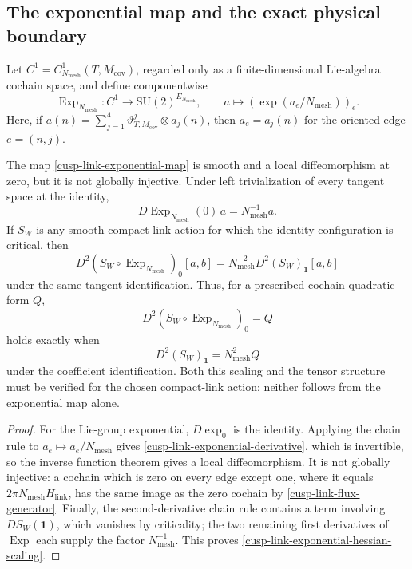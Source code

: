 \subsection{The exponential map and the exact physical boundary}

Let \(C^1=C^1_{N_{\mathrm{mesh}}}(T,M_{\mathrm{cov}})\), regarded only as a
finite-dimensional Lie-algebra cochain space, and define componentwise
\begin{equation}
 \operatorname{Exp}_{N_{\mathrm{mesh}}}:C^1
 \longrightarrow\mathrm{SU}(2)^{E_{N_{\mathrm{mesh}}}},
 \qquad
 a\longmapsto\left(\exp(a_e/N_{\mathrm{mesh}})\right)_e.
 \label{cusp-link-exponential-map}
\end{equation}
Here, if
\(a(n)=\sum_{j=1}^4\vartheta^j_{T,M_{\mathrm{cov}}}\otimes a_j(n)\),
then \(a_e=a_j(n)\) for the oriented edge \(e=(n,j)\).

\begin{proposition}
\label{cusp-link-exponential-local-only}
The map \eqref{cusp-link-exponential-map} is smooth and a local
diffeomorphism at zero, but it is not globally injective.  Under left
trivialization of every tangent space at the identity,
\begin{equation}
 D\operatorname{Exp}_{N_{\mathrm{mesh}}}(0)\,a
 =N_{\mathrm{mesh}}^{-1}a.
 \label{cusp-link-exponential-derivative}
\end{equation}
If \(S_W\) is any smooth compact-link action for which the identity
configuration is critical, then
\begin{equation}
 D^2(S_W\circ\operatorname{Exp}_{N_{\mathrm{mesh}}})_0[a,b]
 =N_{\mathrm{mesh}}^{-2}
  D^2(S_W)_{\mathbf1}[a,b]
 \label{cusp-link-exponential-hessian-scaling}
\end{equation}
under the same tangent identification.  Thus, for a prescribed cochain
quadratic form \(Q\),
\[
 D^2(S_W\circ\operatorname{Exp}_{N_{\mathrm{mesh}}})_0=Q
\]
holds exactly when
\[
 D^2(S_W)_{\mathbf1}=N_{\mathrm{mesh}}^2Q
\]
under the coefficient identification.  Both this scaling and the tensor
structure must be verified for the chosen compact-link action; neither
follows from the exponential map alone.
\end{proposition}

\begin{proof}
For the Lie-group exponential, \(D\exp_0\) is the identity.  Applying the
chain rule to \(a_e\mapsto a_e/N_{\mathrm{mesh}}\) gives
\eqref{cusp-link-exponential-derivative}, which is invertible, so the inverse
function theorem gives a local diffeomorphism.  It is not globally
injective: a cochain which is zero on every edge except one, where it equals
\(2\pi N_{\mathrm{mesh}}H_{\mathrm{link}}\), has the same image as the zero cochain by
\eqref{cusp-link-flux-generator}.  Finally, the second-derivative chain rule
contains a term involving \(DS_W(\mathbf1)\), which vanishes by criticality;
the two remaining first derivatives of \(\operatorname{Exp}\) each supply
the factor \(N_{\mathrm{mesh}}^{-1}\).  This proves
\eqref{cusp-link-exponential-hessian-scaling}.
\end{proof}

